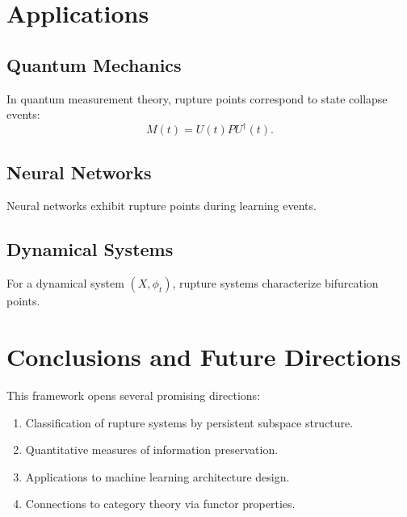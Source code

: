 \documentclass[12pt]{article}
\theoremstyle{definition}
\theoremstyle{plain}
\begin{document}
\section{Applications}

\subsection{Quantum Mechanics}
In quantum measurement theory, rupture points correspond to state collapse events:
\[
M(t) = U(t)PU^\dagger(t).
\]

\subsection{Neural Networks}
Neural networks exhibit rupture points during learning events.

\subsection{Dynamical Systems}
For a dynamical system \( (X, \phi_t) \), rupture systems characterize bifurcation points.

\section{Conclusions and Future Directions}

This framework opens several promising directions:
\begin{enumerate}
    \item Classification of rupture systems by persistent subspace structure.
    \item Quantitative measures of information preservation.
    \item Applications to machine learning architecture design.
    \item Connections to category theory via functor properties.
\end{enumerate}
\end{document}
